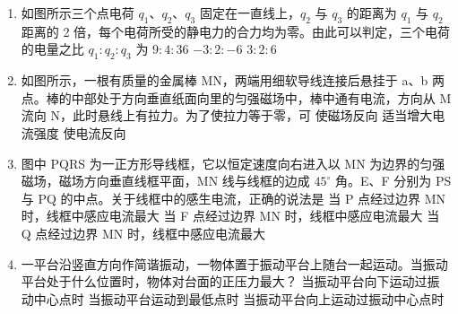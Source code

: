 \documentclass[\gkver]{gaokaozhenti}
\begin{document}
\begin{enumerate}
\item
如图所示三个点电荷 $q_{1}$、$q_{2}$、$q_{3}$ 固定在一直线上，$q_{2}$ 与 $q_{3}$ 的距离为 $q_{1}$ 与 $q_{2}$ 距离的 2 倍，每个电荷所受的静电力的合力均为零。由此可以判定，三个电荷的电量之比 $q_{1}:q_{2}:q_{3}$ 为
\onepicture[w=9cm]{}
{$9:4:36$}
{$-3:2:-6$}
{$3:2:6$}

\item
如图所示，一根有质量的金属棒 MN，两端用细软导线连接后悬挂于 a、b 两点。棒的中部处于方向垂直纸面向里的匀强磁场中，棒中通有电流，方向从 M 流向 N，此时悬线上有拉力。为了使拉力等于零，可
\onepicture[w=6cm]{}
{使磁场反向}
{适当增大电流强度}
{使电流反向}

\item
图中 PQRS 为一正方形导线框，它以恒定速度向右进入以 MN 为边界的匀强磁场，磁场方向垂直线框平面，MN 线与线框的边成 $45^{\circ}$ 角。E、F 分别为 PS 与 PQ 的中点。关于线框中的感生电流，正确的说法是
\onepicture[w=8cm]{}
{当 P 点经过边界 MN 时，线框中感应电流最大}
{当 F 点经过边界 MN 时，线框中感应电流最大}
{当 Q 点经过边界 MN 时，线框中感应电流最大}

\item
一平台沿竖直方向作简谐振动，一物体置于振动平台上随台一起运动。当振动平台处于什么位置时，物体对台面的正压力最大？
{当振动平台向下运动过振动中心点时}
{当振动平台运动到最低点时}
{当振动平台向上运动过振动中心点时}


\end{enumerate}
\end{document}
